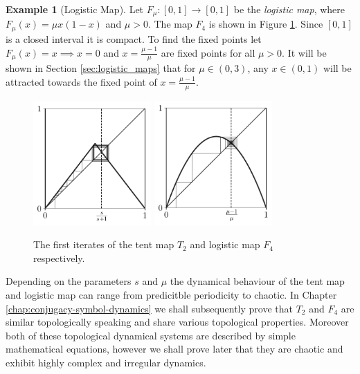 \documentclass[11pt,a4paper,oneside]{memoir}
\theoremstyle{plain}
\theoremstyle{definition}
\newtheorem{exmp}[thm]{Example}
\begin{document}
\begin{exmp}[Logistic Map] \label{exmp:logitic-map}
    Let $F_{\mu}: [0, 1] \to [0, 1]$ be the \emph{logistic map}, where $F_{\mu}(x)=\mu x(1-x)$ and $\mu > 0$. The map $F_4$ is shown in Figure \ref{fig:tent-logistic}. Since $[0, 1]$ is a closed interval it is compact. To find the fixed points let $F_{\mu}(x) = x \implies x = 0$ and $x = \frac{\mu - 1}{\mu}$ are fixed points for all $\mu > 0$. It will be shown in Section \ref{sec:logistic_maps} that for $\mu \in (0, 3)$, any $x \in (0, 1)$ will be attracted towards the fixed point of $x = \frac{\mu - 1}{\mu}$.
\end{exmp}

\begin{figure}[h]
    \centering
    \includegraphics[width=4.5cm]{tent_1.3}
    \includegraphics[width=4.5cm]{logistic_2.85}
    \caption{The first iterates of the tent map $T_2$ and logistic map $F_4$ respectively.}
    \label{fig:tent-logistic}
\end{figure}

Depending on the parameters $s$ and $\mu$ the dynamical behaviour of the tent map and logistic map can range from predicitble periodicity to chaotic. In Chapter \ref{chap:conjugacy-symbol-dynamics} we shall subsequently prove that $T_2$ and $F_4$ are similar topologically speaking and share various topological properties. Moreover both of these topological dynamical systems are described by simple mathematical equations, however we shall prove later that they are chaotic and exhibit highly complex and irregular dynamics.
\end{document}
